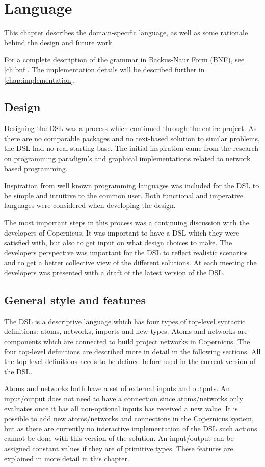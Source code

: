 \chapter{Language}\label{chap:language}
This chapter describes the domain-specific language, as well as some
rationale behind the design and future work.

For a complete description of the grammar in Backus-Naur Form (BNF),
see \autoref{ch:bnf}. The implementation details will be described
further in \autoref{chap:implementation}.

\section{Design}
Designing the DSL was a process which continued through the entire
project. As there are no comparable packages and no text-based
solution to similar problems, the DSL had no real starting base. The
initial inspiration came from the research on programming paradigm's
and graphical implementations related to network based programming.

Inspiration from well known programming languages was included for the
DSL to be simple and intuitive to the common user. Both functional and
imperative languages were considered when developing the design.

The most important steps in this process was a continuing discussion
with the developers of Copernicus. It was important to have a DSL
which they were satisfied with, but also to get input on what design
choices to make. The developers perspective was important for the DSL
to reflect realistic scenarios and to get a better collective view of
the different solutions. At each meeting the developers was presented
with a draft of the latest version of the DSL.

\section{General style and features}
The DSL is a descriptive language which has four types of top-level
syntactic definitions: atoms, networks, imports and new types. Atoms
and networks are components which are connected to build project
networks in Copernicus. The four top-level definitions are described
more in detail in the following sections. All the top-level
definitions needs to be defined before used in the current version of
the DSL.

Atoms and networks both have a set of external inputs and outputs. An
input/output does not need to have a connection since atoms/networks
only evaluates once it has all non-optional inputs has received a new
value. It is possible to add new atoms/networks and connections in the
Copernicus system, but as there are currently no interactive
implementation of the DSL such actions cannot be done with this
version of the solution. An input/output can be assigned constant
values if they are of primitive types. These features are explained in
more detail in this chapter.


